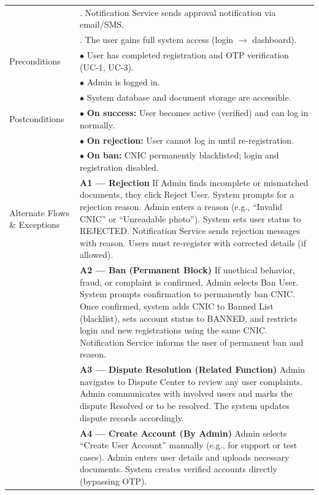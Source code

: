 \begin{longtable}{|>{\raggedright\arraybackslash}p{4cm}|>{\raggedright\arraybackslash}p{11cm}|}
& 8. Notification Service sends approval notification via email/SMS. \\
& 9. The user gains full system access (login $\rightarrow$ dashboard). \\
\hline
Preconditions & $\bullet$ User has completed registration and OTP verification (UC-1, UC-3). \\
& $\bullet$ Admin is logged in. \\
& $\bullet$ System database and document storage are accessible. \\
\hline
Postconditions & $\bullet$ \textbf{On success:} User becomes active (verified) and can log in normally. \\
& $\bullet$ \textbf{On rejection:} User cannot log in until re-registration. \\
& $\bullet$ \textbf{On ban:} CNIC permanently blacklisted; login and registration disabled. \\
\hline
Alternate Flows \& Exceptions & \textbf{A1 — Rejection} \newline If Admin finds incomplete or mismatched documents, they click Reject User. System prompts for a rejection reason. Admin enters a reason (e.g., ``Invalid CNIC'' or ``Unreadable photo''). System sets user status to REJECTED. Notification Service sends rejection messages with reason. Users must re-register with corrected details (if allowed). \\
& \textbf{A2 — Ban (Permanent Block)} \newline If unethical behavior, fraud, or complaint is confirmed, Admin selects Ban User. System prompts confirmation to permanently ban CNIC. Once confirmed, system adds CNIC to Banned List (blacklist), sets account status to BANNED, and restricts login and new registrations using the same CNIC. Notification Service informs the user of permanent ban and reason. \\
& \textbf{A3 — Dispute Resolution (Related Function)} \newline Admin navigates to Dispute Center to review any user complaints. Admin communicates with involved users and marks the dispute Resolved or to be resolved. The system updates dispute records accordingly. \\
& \textbf{A4 — Create Account (By Admin)} \newline Admin selects ``Create User Account'' manually (e.g., for support or test cases). Admin enters user details and uploads necessary documents. System creates verified accounts directly (bypassing OTP). \\

\end{longtable}
